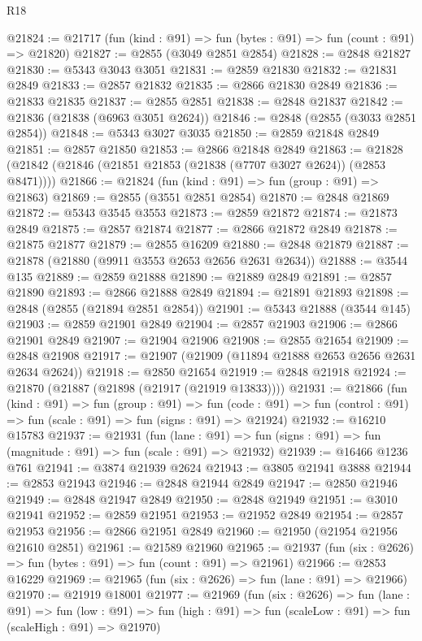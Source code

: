 \begin{lexlean}{R18}
\begin{coremodule}
@21824 := @21717 (fun (kind : @91) => fun (bytes : @91) => fun (count : @91) => @21820)
@21827 := @2855 (@3049 @2851 @2854)
@21828 := @2848 @21827
@21830 := @5343 @3043 @3051
@21831 := @2859 @21830
@21832 := @21831 @2849
@21833 := @2857 @21832
@21835 := @2866 @21830 @2849
@21836 := @21833 @21835
@21837 := @2855 @2851
@21838 := @2848 @21837
@21842 := @21836 (@21838 (@6963 @3051 @2624))
@21846 := @2848 (@2855 (@3033 @2851 @2854))
@21848 := @5343 @3027 @3035
@21850 := @2859 @21848 @2849
@21851 := @2857 @21850
@21853 := @2866 @21848 @2849
@21863 := @21828 (@21842 (@21846 (@21851 @21853 (@21838 (@7707 @3027 @2624)) (@2853 @8471))))
@21866 := @21824 (fun (kind : @91) => fun (group : @91) => @21863)
@21869 := @2855 (@3551 @2851 @2854)
@21870 := @2848 @21869
@21872 := @5343 @3545 @3553
@21873 := @2859 @21872
@21874 := @21873 @2849
@21875 := @2857 @21874
@21877 := @2866 @21872 @2849
@21878 := @21875 @21877
@21879 := @2855 @16209
@21880 := @2848 @21879
@21887 := @21878 (@21880 (@9911 @3553 @2653 @2656 @2631 @2634))
@21888 := @3544 @135
@21889 := @2859 @21888
@21890 := @21889 @2849
@21891 := @2857 @21890
@21893 := @2866 @21888 @2849
@21894 := @21891 @21893
@21898 := @2848 (@2855 (@21894 @2851 @2854))
@21901 := @5343 @21888 (@3544 @145)
@21903 := @2859 @21901 @2849
@21904 := @2857 @21903
@21906 := @2866 @21901 @2849
@21907 := @21904 @21906
@21908 := @2855 @21654
@21909 := @2848 @21908
@21917 := @21907 (@21909 (@11894 @21888 @2653 @2656 @2631 @2634 @2624))
@21918 := @2850 @21654
@21919 := @2848 @21918
@21924 := @21870 (@21887 (@21898 (@21917 (@21919 @13833))))
@21931 := @21866
    (fun (kind : @91) =>
    fun (group : @91) =>
    fun (code : @91) => fun (control : @91) => fun (scale : @91) => fun (signs : @91) => @21924)
@21932 := @16210 @15783
@21937 := @21931
    (fun (lane : @91) => fun (signs : @91) => fun (magnitude : @91) => fun (scale : @91) => @21932)
@21939 := @16466 @1236 @761
@21941 := @3874 @21939 @2624
@21943 := @3805 @21941 @3888
@21944 := @2853 @21943
@21946 := @2848 @21944 @2849
@21947 := @2850 @21946
@21949 := @2848 @21947 @2849
@21950 := @2848 @21949
@21951 := @3010 @21941
@21952 := @2859 @21951
@21953 := @21952 @2849
@21954 := @2857 @21953
@21956 := @2866 @21951 @2849
@21960 := @21950 (@21954 @21956 @21610 @2851)
@21961 := @21589 @21960
@21965 := @21937 (fun (six : @2626) => fun (bytes : @91) => fun (count : @91) => @21961)
@21966 := @2853 @16229
@21969 := @21965 (fun (six : @2626) => fun (lane : @91) => @21966)
@21970 := @21919 @18001
@21977 := @21969
    (fun (six : @2626) =>
    fun (lane : @91) =>
    fun (low : @91) => fun (high : @91) => fun (scaleLow : @91) => fun (scaleHigh : @91) => @21970)

\end{coremodule}
\end{lexlean}
